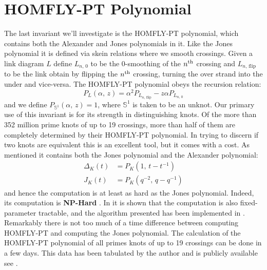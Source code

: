 \section{HOMFLY-PT Polynomial}
    The last invariant we'll investigate is the HOMFLY-PT polynomial, which
    contains both the Alexander and Jones polynomials in it. Like the Jones
    polynomial it is defined via skein relations where we smooth crossings.
    Given a link diagram $L$ define $L_{n,\,0}$ to be the 0-smoothing of the
    $n^{\small\textrm{th}}$ crossing and $L_{n,\,\textrm{flip}}$ to be the
    link obtain by flipping the $n^{\small\textrm{th}}$ crossing, turning the
    over strand into the under and vice-versa. The HOMFLY-PT polynomial obeys
    the recursion relation:
    \begin{equation}
        P_{L}(\alpha,\,z)
        =\alpha^{2}P_{L_{n,\,\textrm{flip}}}-z\alpha{P}_{L_{n,\,0}}
    \end{equation}
    and we define $P_{\mathbb{S}^{1}}(\alpha,\,z)=1$, where
    $\mathbb{S}^{1}$ is taken to be an unknot. Our primary use of this
    invariant is for its strength in distinguishing knots. Of the more than
    352 million prime knots of up to 19 crossings, more than half of them are
    completely determined by their HOMFLY-PT polynomial. In trying to discern
    if two knots are equivalent this is an excellent tool, but it comes with a
    cost. As mentioned it contains both the Jones polynomial and the
    Alexander polynomial:
    \begin{align}
        \Delta_{K}(t)&=P_{K}(1,\,t-t^{-1})\\
        J_{K}(t)&=P_{K}(q^{-2},\,q-q^{-1})
    \end{align}
    and hence the computation is at least as hard as the Jones polynomial.
    Indeed, its computation is \textbf{NP-Hard}
    \cite[p.~653]{HOMFLYPTNPHard}. In
    \cite{Burton2018HOMFLFixedParameter} it is shown that the computation is
    also fixed-parameter tractable, and the algorithm presented has been
    implemented in \cite{regina}. Remarkably there is not too much of a time
    difference between computing HOMFLY-PT and computing the Jones polynomial.
    The calculation of the HOMFLY-PT polynomial of all primes knots of up to
    19 crossings can be done in a few days. This data has been tabulated by the
    author and is publicly available see \cite{HOMFLYData}.
